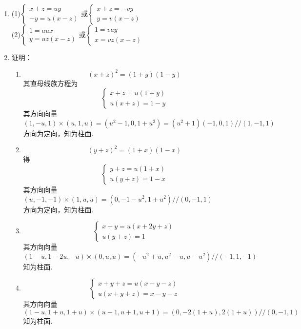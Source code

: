 \documentclass[UTF8]{ctexart}
\begin{document}
\begin{enumerate}
\item (1)$\left\{\begin{array}{l}x+z=uy\\-y=u\left(x-z\right)\end{array}\right.$或$\left\{\begin{array}{l}x+z=-vy\\y=v\left(x-z\right)\end{array}\right.$\\
(2)$\left\{\begin{array}{l}1=aux\\y=uz\left(x-z\right)\end{array}\right.$或$\left\{\begin{array}{l}1=vay\\x=vz\left(x-z\right)\end{array}\right.$

\item 证明：\begin{enumerate}[(1)]
\item $$\left(x+z\right)^2=\left(1+y\right)\left(1-y\right)$$
其直母线族方程为$$\left\{\begin{array}{l}x+z=u\left(1+y\right)\\u\left(x+z\right)=1-y\end{array}\right.$$
其方向向量$\left(1,-u,1\right)\times\left(u,1,u\right)=\left(u^2-1,0,1+u^2\right)=\left(u^2+1\right)\left(-1,0,1\right)//\left(1,-1,1\right)$\\
方向为定向，知为柱面. 
\item $$\left(y+z\right)^2=\left(1+x\right)\left(1-x\right)$$
得$$\left\{\begin{array}{l}y+z=u\left(1+x\right)\\u\left(y+z\right)=1-x\end{array}\right.$$
其方向向量$\left(u,-1,-1\right)\times\left(1,u,u\right)=\left(0,-1-u^2,1+u^2\right)//\left(0,-1,1\right)$\\
方向为定向，知为柱面. 
\item $$\left\{\begin{array}{l}x+y=u\left(x+2y+z\right)\\u\left(y+z\right)=1\end{array}\right.$$
其方向向量$\left(1-u,1-2u,-u\right)\times\left(0,u,u\right)=\left(-u^2+u,u^2-u,u-u^2\right)//\left(-1,1,-1\right)$\\
知为柱面. 
\item $$\left\{\begin{array}{l}x+y+z=u\left(x-y-z\right)\\u\left(x+y+z\right)=x-y-z\end{array}\right.$$
其方向向量$\left(1-u,1+u,1+u\right)\times\left(u-1,u+1,u+1\right)=\left(0,-2\left(1+u\right),2\left(1+u\right)\right)//\left(0,-1,1\right)$\\
知为柱面. 
\end{enumerate}


\end{enumerate}
\end{document}
